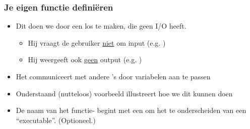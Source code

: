 \begin{frame}
\frametitle{Je eigen functie defini\"eren}


\begin{itemize}
  \item<1-> Dit doen we door een los  te maken, die geen I/O heeft.
  \begin{itemize}
    \item<2-> Hij vraagt de gebruiker \underline{niet} om input (e.g. )
    \item<3-> Hij weergeeft ook \underline{geen} output (e.g. )
  \end{itemize}
  \item<4-> Het  communiceert met andere 's door variabelen aan te passen
  \item<5-> Onderstaand (nutteloos) voorbeeld illustreert hoe we dit kunnen doen
  \item<6-> De naam van het functie- begint met een \tifonttxt{\theta} om het  te onderscheiden van een ``executable''. (Optioneel.)
\end{itemize}

\vspace{2.5cm}




\end{frame}


